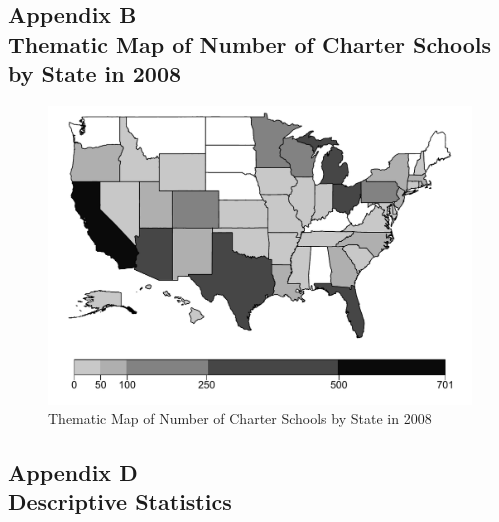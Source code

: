\documentclass[letterpaper,12p,twoside]{article} %
\begin{document}
{%
\newpage
{}
\subsection*{Appendix B\\Thematic Map of Number of Charter Schools by State in 2008}
\label{appendixMap}
\begin{figure}[h]
\includegraphics[width=\textwidth]{../Figures/CharterMap.pdf}
\caption{Thematic Map of Number of Charter Schools by State in 2008}
\label{fig:charterMap}
\end{figure}


\newpage
{}
\subsection*{Appendix D\\Descriptive Statistics}
\label{appendixDescriptives}

\begin{singlespace}

 \clearpage
 \clearpage

 \clearpage
 \clearpage


\end{singlespace}}
\end{document}
